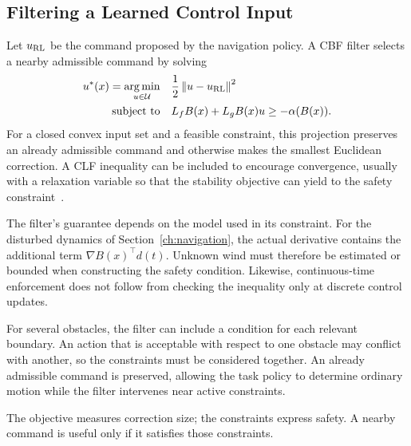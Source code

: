 \subsection{Filtering a Learned Control Input}
Let $u_{\rm RL}$ be the command proposed by the navigation policy. A CBF filter selects a nearby admissible command by solving
\begin{equation}
\begin{aligned}
u^*(x)=\operatorname*{arg\,min}_{u\in\mathcal U}\quad&\frac12\left\lVert u-u_{\rm RL}\right\rVert^2\\
\text{subject to}\quad&L_fB(x)+L_gB(x)u\geq-\alpha(B(x)).
\end{aligned}
\label{eq:cbfqp}
\end{equation}
For a closed convex input set and a feasible constraint, this projection preserves an already admissible command and otherwise makes the smallest Euclidean correction. A CLF inequality can be included to encourage convergence, usually with a relaxation variable so that the stability objective can yield to the safety constraint~\cite{litAmes2017}.

The filter's guarantee depends on the model used in its constraint. For the disturbed dynamics of Section~\ref{ch:navigation}, the actual derivative contains the additional term $\nabla B(x)^\top d(t)$. Unknown wind must therefore be estimated or bounded when constructing the safety condition. Likewise, continuous-time enforcement does not follow from checking the inequality only at discrete control updates.

For several obstacles, the filter can include a condition for each relevant boundary. An action that is acceptable with respect to one obstacle may conflict with another, so the constraints must be considered together. An already admissible command is preserved, allowing the task policy to determine ordinary motion while the filter intervenes near active constraints.

The objective measures correction size; the constraints express safety. A nearby command is useful only if it satisfies those constraints.

\clearpage
